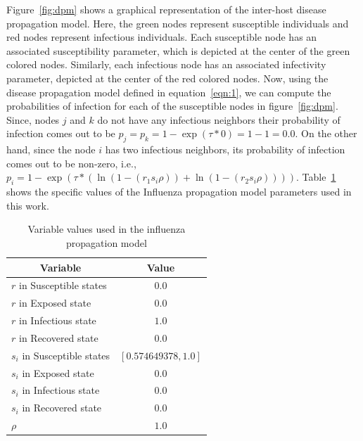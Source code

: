 \documentclass[doublespace]{VTthesis}
\begin{document}
    Figure~\ref{fig:dpm} shows a graphical representation of the inter-host disease propagation model. Here, the green nodes represent susceptible individuals and red nodes represent infectious individuals. Each susceptible node has an associated susceptibility parameter, which is depicted at the center of the green colored nodes. Similarly, each infectious node has an associated infectivity parameter, depicted at the center of the red colored nodes. Now, using the disease propagation model defined in equation~\ref{eqn:1}, we can compute the probabilities of infection for each of the susceptible nodes in figure~\ref{fig:dpm}. Since, nodes $j$ and $k$ do not have any infectious neighbors their probability of infection comes out to be $p_j = p_k = 1 - \exp (\tau * 0 ) = 1 - 1 = 0.0$. On the other hand, since the node $i$ has two infectious neighbors, its probability of infection comes out to be non-zero, i.e., $p_i = 1 - \exp (\tau * (\ln (1 - (r_1 s_i \rho)) + \ln (1 - (r_2 s_i \rho))))$. Table~\ref{table:1} shows the specific values of the Influenza propagation model parameters used in this work. 
    \begin{table}[!t]
    \renewcommand{\arraystretch}{1.3}
    \centering
    \caption{Variable values used in the influenza propagation model}
    \begin{tabular}{|l|c|}
    \hline
    \multicolumn{1}{|c|}{\textbf{Variable}} & \textbf{Value}  \\ \hline
    $r$ in Susceptible states & $0.0$ \\ \hline
    $r$ in Exposed state & $0.0$ \\ \hline
    $r$ in Infectious state & $1.0$ \\ \hline
    $r$ in Recovered state & $0.0$ \\ \hline
    $s_i$ in Susceptible states & $[0.574649378, 1.0]$ \\ \hline
    $s_i$ in Exposed state & $0.0$ \\ \hline 
    $s_i$ in Infectious state & $0.0$ \\ \hline
    $s_i$ in Recovered state & $0.0$ \\ \hline
    $\rho$ & $1.0$ \\ \hline
    \end{tabular}
    \label{table:1}
    \end{table}
    
\end{document}
